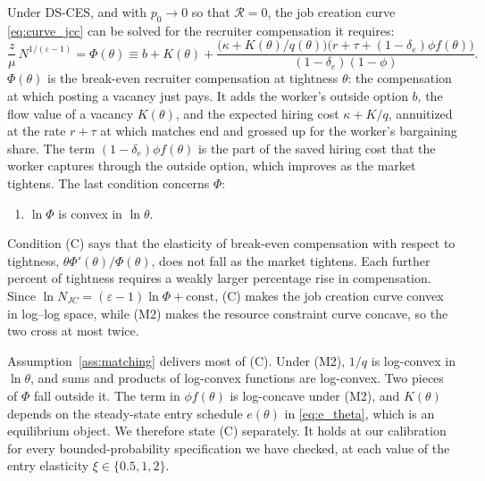 \documentclass[authoryear, review, 12pt]{elsarticle}
\begin{document}
Under DS-CES, and with $p_0\to0$ so that $\mathcal{R}=0$, the job creation curve
\eqref{eq:curve_jcc} can be solved for the recruiter compensation it requires:
\begin{equation}\label{eq:Phi}
	\frac{z}{\mu}\,N^{1/(\varepsilon-1)}=\Phi(\theta)\equiv b+K(\theta)
	+\frac{\bigl(\kappa+K(\theta)/q(\theta)\bigr)\bigl(r+\tau+(1-\delta_e)\phi f(\theta)\bigr)}{(1-\delta_e)(1-\phi)}.
\end{equation}
$\Phi(\theta)$ is the break-even recruiter compensation at tightness $\theta$: the
compensation at which posting a vacancy just pays. It adds the worker's outside option $b$,
the flow value of a vacancy $K(\theta)$, and the expected hiring cost $\kappa+K/q$,
annuitized at the rate $r+\tau$ at which matches end and grossed up for the worker's
bargaining share. The term $(1-\delta_e)\phi f(\theta)$ is the part of the saved hiring cost
that the worker captures through the outside option, which improves as the market tightens. The last
condition concerns $\Phi$:
\begin{enumerate}
	\item[(C)] $\ln\Phi$ is convex in $\ln\theta$.
\end{enumerate}
Condition (C) says that the elasticity of break-even compensation with respect to
tightness, $\theta\Phi'(\theta)/\Phi(\theta)$, does not fall as the market tightens. Each
further percent of tightness requires a weakly larger percentage rise in compensation.
Since $\ln N_{JC}=(\varepsilon-1)\ln\Phi+\text{const}$, (C) makes the job creation curve
convex in log--log space, while (M2) makes the resource constraint curve concave, so the
two cross at most twice.

Assumption~\ref{ass:matching} delivers most of (C). Under (M2), $1/q$ is log-convex in
$\ln\theta$, and sums and products of log-convex functions are log-convex. Two pieces of
$\Phi$ fall outside it. The term in $\phi f(\theta)$ is log-concave under (M2), and $K(\theta)$
depends on the steady-state entry schedule $e(\theta)$ in \eqref{eq:e_theta}, which is an
equilibrium object. We therefore state (C) separately. It holds at our calibration for every
bounded-probability specification we have checked, at each value of the entry elasticity
$\xi\in\{0.5,1,2\}$.
\end{document}
